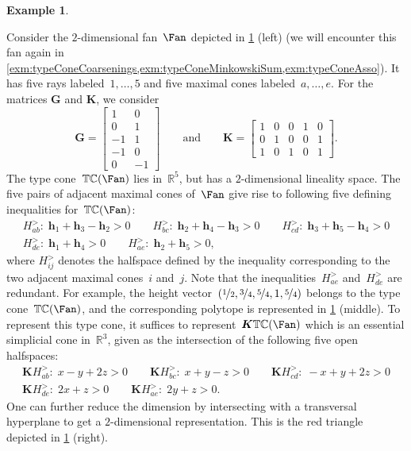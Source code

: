 \documentclass{amsart}
\theoremstyle{definition}
\newtheorem{example}[theorem]{Example}
\newcommand{\R}{\mathbb{R}} %
\renewcommand{\b}[1]{{\boldsymbol{#1}}} %
\newcommand{\transpose}[1]{{#1}^T} %
\newcommand{\typeCone}{\mathbb{TC}} %
\begin{document}
\begin{example}
\begin{figure}[b]
	\label{fig:typeCone}
\end{figure}
%
Consider the $2$-dimensional fan~$\Fan$ depicted in \cref{fig:typeCone} (left) (we will encounter this fan again in \cref{exm:typeConeCoarsenings,exm:typeConeMinkowskiSum,exm:typeConeAsso}).
It has five rays labeled~$1, \dots, 5$ and five maximal cones labeled~$a,\dots, e$.
For the matrices $\b{G}$ and $\b{K}$, we consider
\[
\b{G} = \begin{bmatrix} 1 & 0 \\ 0 & 1 \\ -1 & 1 \\ -1 & 0 \\ 0 & -1 \end{bmatrix}
\qquad\text{and}\qquad
\b{K} = \begin{bmatrix} 1 & 0 & 0 & 1 & 0 \\ 0 & 1 & 0 & 0 & 1 \\ 1 & 0 & 1 & 0 & 1 \end{bmatrix}.
\]
The type cone~$\typeCone(\Fan)$ lies in~$\R^5$, but has a $2$-dimensional lineality space.
The five pairs of adjacent maximal cones of~$\Fan$ give rise to following five defining inequalities for~$\typeCone(\Fan)$:
\begin{gather*}
H^>_{ab}: \; \b{h}_1 + \b{h}_3 - \b{h}_2 > 0
\qquad
H^>_{bc}: \; \b{h}_2 + \b{h}_4 - \b{h}_3 > 0
\qquad
H^>_{cd}: \; \b{h}_3 + \b{h}_5 - \b{h}_4 > 0
\\
H^>_{de}: \; \b{h}_1 + \b{h}_4 > 0
\qquad
H^>_{ae}: \; \b{h}_2 + \b{h}_5 > 0,
\end{gather*}
where $H^>_{ij}$ denotes the halfspace defined by the inequality corresponding to the two adjacent maximal cones~$i$ and~$j$.
Note that the inequalities~$H^>_{ae}$ and~$H^>_{de}$ are redundant.
For example, the height vector~$(\nicefrac{1}{2}, \nicefrac{3}{4}, \nicefrac{5}{4}, 1, \nicefrac{5}{4})$ belongs to the type cone~$\typeCone(\Fan)$, and the corresponding polytope is represented in \cref{fig:typeCone} (middle).
To represent this type cone, it suffices to represent~$\b{K}\typeCone(\Fan)$ which is an essential simplicial cone in~$\R^3$, given as the intersection of the following five open halfspaces:
\begin{gather*}
\b{K}H^>_{ab}: \; {x} - {y} +2 {z} > 0
\qquad
\b{K}H^>_{bc}: \; {x} + {y} - {z} > 0
\qquad
\b{K}H^>_{cd}: \; -{x} + {y} +2 {z} > 0
\\
\b{K}H^>_{de}: \; 2{x} + {z} > 0
\qquad
\b{K}H^>_{ae}: \; 2{y} + {z} > 0.
\end{gather*}
One can further reduce the dimension by intersecting with a transversal hyperplane to get a $2$-dimensional representation.
This is the red triangle depicted in \cref{fig:typeCone} (right).
\end{example}
\end{document}
